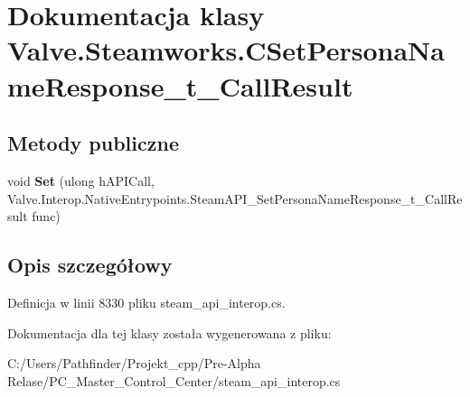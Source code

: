 \hypertarget{class_valve_1_1_steamworks_1_1_c_set_persona_name_response__t___call_result}{}\section{Dokumentacja klasy Valve.\+Steamworks.\+C\+Set\+Persona\+Name\+Response\+\_\+t\+\_\+\+Call\+Result}
\label{class_valve_1_1_steamworks_1_1_c_set_persona_name_response__t___call_result}
\subsection*{Metody publiczne}
\begin{DoxyCompactItemize}
\item 
\mbox{\label{class_valve_1_1_steamworks_1_1_c_set_persona_name_response__t___call_result_a84f1a787850a5d25f0321afb5fa7bce0}} 
void {\bfseries Set} (ulong h\+A\+P\+I\+Call, Valve.\+Interop.\+Native\+Entrypoints.\+Steam\+A\+P\+I\+\_\+\+Set\+Persona\+Name\+Response\+\_\+t\+\_\+\+Call\+Result func)
\end{DoxyCompactItemize}


\subsection{Opis szczegółowy}


Definicja w linii 8330 pliku steam\+\_\+api\+\_\+interop.\+cs.



Dokumentacja dla tej klasy została wygenerowana z pliku\+:\begin{DoxyCompactItemize}
\item 
C\+:/\+Users/\+Pathfinder/\+Projekt\+\_\+cpp/\+Pre-\/\+Alpha Relase/\+P\+C\+\_\+\+Master\+\_\+\+Control\+\_\+\+Center/steam\+\_\+api\+\_\+interop.\+cs\end{DoxyCompactItemize}
